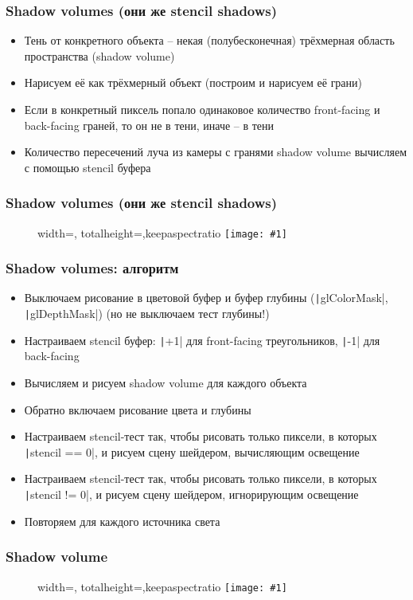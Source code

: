 \documentclass{beamer}
\newcommand{\slideimage}[1]{
  \begin{figure}
    \begin{adjustbox}{width=\textwidth, totalheight=\textheight-2\baselineskip-2\baselineskip,keepaspectratio}
      \texttt{[image: \#1]}
    \end{adjustbox}
  \end{figure}
}
\begin{document}
\begin{frame}[fragile]
\frametitle{Shadow volumes (они же stencil shadows)}
\begin{itemize}
\item Тень от конкретного объекта -- некая (полубесконечная) трёхмерная область пространства (shadow volume)
\pause
\item Нарисуем её как трёхмерный объект (построим и нарисуем её грани)
\pause
\item Если в конкретный пиксель попало одинаковое количество front-facing и back-facing граней, то он не в тени, иначе -- в тени
\pause
\item Количество пересечений луча из камеры с гранями shadow volume вычисляем с помощью stencil буфера
\end{itemize}
\end{frame}

\begin{frame}[fragile]
\frametitle{Shadow volumes (они же stencil shadows)}
\slideimage{shadow-volumes-scheme.png}
\end{frame}

\begin{frame}[fragile]
\frametitle{Shadow volumes: алгоритм}
\begin{itemize}
\item Выключаем рисование в цветовой буфер и буфер глубины (\texttt|glColorMask|, \texttt|glDepthMask|) (но не выключаем тест глубины!)
\pause
\item Настраиваем stencil буфер: \texttt|+1| для front-facing треугольников, \texttt|-1| для back-facing
\pause
\item Вычисляем и рисуем shadow volume для каждого объекта
\pause
\item Обратно включаем рисование цвета и глубины
\pause
\item Настраиваем stencil-тест так, чтобы рисовать только пиксели, в которых \texttt|stencil == 0|, и рисуем сцену шейдером, вычисляющим освещение
\pause
\item Настраиваем stencil-тест так, чтобы рисовать только пиксели, в которых \texttt|stencil != 0|, и рисуем сцену шейдером, игнорирующим освещение
\pause
\item Повторяем для каждого источника света
\end{itemize}
\end{frame}

\begin{frame}[fragile]
\frametitle{Shadow volume}
\slideimage{shadow-volume2.jpg}
\end{frame}
\end{document}
